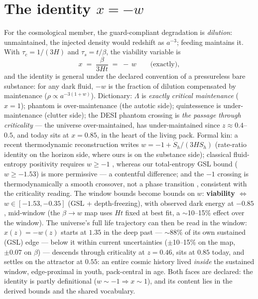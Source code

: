 \documentclass[11pt]{article}
\begin{document}
\section{The identity $x = -w$}
For the cosmological member, the guard-compliant degradation is \emph{dilution}: unmaintained,
the injected density would redshift as $a^{-3}$; feeding maintains it. With
$\tau_c = 1/(3H)$ and $\tau_s = t/\beta$, the viability variable is
\begin{equation}
x \;=\; \frac{\beta}{3Ht} \;=\; -\,w \qquad \text{(exactly)},
\end{equation}
and the identity is general under the declared convention of a pressureless bare substance:
for any dark fluid, $-w$ is the fraction of dilution compensated by maintenance
($\rho \propto a^{-3(1+w)}$). Dictionary: $\Lambda$ is \emph{exactly critical maintenance}
($x=1$); phantom is over-maintenance (the autotic side); quintessence is under-maintenance
(clutter side); the DESI phantom crossing is \emph{the passage through criticality} --- the
universe over-maintained, has under-maintained since $z \approx 0.4$--$0.5$, and today sits at
$x = 0.85$, in the heart of the living pack. Formal kin: a recent thermodynamic reconstruction
writes $w = -1 + \dot S_h/(3H S_h)$ \cite{Reco2026} (rate-ratio identity on the horizon side,
where ours is on the substance side); classical fluid-entropy positivity requires $w \ge -1$
\cite{Duarte2019}, whereas our total-entropy GSL bound ($w \ge -1.53$) is more permissive ---
a contentful difference; and the $-1$ crossing is thermodynamically a smooth crossover, not a
phase transition \cite{Crossing}, consistent with the criticality reading. The window bounds
become bounds on $w$: \textbf{viability $\Leftrightarrow$ $w \in [-1.53, -0.35]$} (GSL +
depth-freezing), with observed dark energy at $-0.85$, mid-window (the $\beta\to w$ map uses $Ht$ fixed at best fit, a $\sim$10--15\% effect over the window). The universe's full life trajectory can then be read in the window: $x(z) = -w(z)$ starts at $1.35$ in the deep past --- $\sim 88\%$ of its own sustained (GSL) edge --- below it within current uncertainties ($\pm$10--15\% on the map, $\pm 0.07$ on $\beta$) --- descends through criticality at $z = 0.46$, sits at $0.85$ today, and settles on the attractor at $0.55$: an entire cosmic history lived \emph{inside} the sustained window, edge-proximal in youth, pack-central in age. Both faces are declared:
the identity is partly definitional ($w \sim -1 \Rightarrow x \sim 1$), and its content lies in
the derived bounds and the shared vocabulary.
\end{document}
